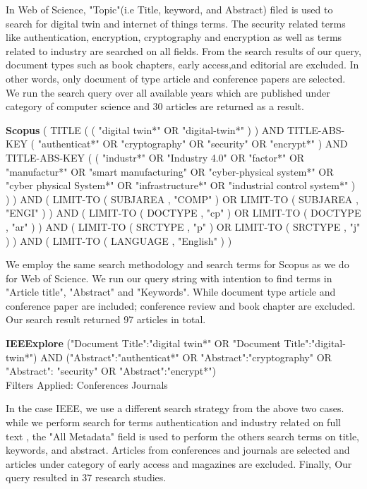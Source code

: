 In Web of Science, "Topic"(i.e Title, keyword, and Abstract) filed is used to search for digital twin and internet of things terms. The security related terms like authentication, encryption, cryptography and encryption as well as terms related to industry are searched on all fields. From the search results of our query, document types such as book chapters, early access,and editorial are excluded. In other words, only document of type article and conference papers are selected. We run the search query over all available years which are published under category of computer science and 30 articles are returned as a result.
\begin{tcolorbox}[colback=black!5!white, sharp corners=all, colframe=white!95!black]
\textbf{Scopus}
\tcblower
( TITLE ( ( "digital twin*" OR "digital-twin*" ) ) AND TITLE-ABS-KEY ( "authenticat*" OR "cryptography" OR "security" OR "encrypt*" ) AND TITLE-ABS-KEY ( ( "industr*" OR "Industry 4.0" OR "factor*" OR "manufactur*" OR "smart manufacturing" OR "cyber-physical system*" OR "cyber physical System*" OR "infrastructure*" OR "industrial control system*" ) ) ) AND ( LIMIT-TO ( SUBJAREA , "COMP" ) OR LIMIT-TO ( SUBJAREA , "ENGI" ) ) AND ( LIMIT-TO ( DOCTYPE , "cp" ) OR LIMIT-TO ( DOCTYPE , "ar" ) ) AND ( LIMIT-TO ( SRCTYPE , "p" ) OR LIMIT-TO ( SRCTYPE , "j" ) ) AND ( LIMIT-TO ( LANGUAGE , "English" ) )
\end{tcolorbox}
We employ the same search methodology and search terms for Scopus as we do for Web of Science. We run our query string with intention to find terms in "Article title", "Abstract" and "Keywords". While document type article and conference paper are included; conference review and book chapter are excluded. Our search result returned 97 articles in total. 

\begin{tcolorbox}[colback=black!5!white, sharp corners=all, colframe=white!95!black]
\textbf{IEEExplore}
\tcblower
("Document Title":"digital twin*" OR "Document Title":"digital-twin*") AND ("Abstract":"authenticat*" OR "Abstract":"cryptography" OR "Abstract": "security" OR "Abstract":"encrypt*") \\

Filters Applied: Conferences Journals
\end{tcolorbox}
In the case IEEE, we use a different search strategy from the above two cases. while we perform search for terms  authentication and industry related on full text , the "All Metadata" field is used to perform the others search terms on title, keywords, and abstract. Articles from conferences and journals are selected and articles under category of early access and magazines are excluded. Finally, Our query resulted in 37 research studies.   

